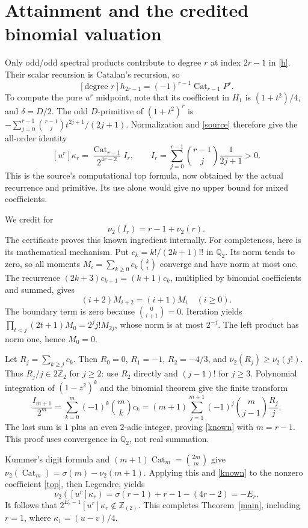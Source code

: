 \documentclass[11pt]{article}
\newcommand{\Z}{\mathbb Z}\newcommand{\Q}{\mathbb Q}
\newcommand{\loc}{\Z_{(2)}}\newcommand{\val}{\nu_2}
\newcommand{\Cat}{\operatorname{Cat}}
\newcommand{\sig}{\sigma}
\newcommand{\coef}[1]{\left[#1\right]}
\begin{document}
\newpage
\section{Attainment and the credited binomial valuation}
Only odd/odd spectral products contribute to degree $r$ at index $2r-1$ in \eqref{h}. Their scalar recursion is Catalan's recursion, so
\[
 \coef{\text{degree }r}h_{2r-1}=(-1)^{r-1}\Cat_{r-1}P^r.
\]
To compute the pure $u^r$ midpoint, note that its coefficient in $H_1$ is $(1+t^2)/4$, and $\delta=D/2$. The odd $D$-primitive of $(1+t^2)^r$ is
$-\sum_{j=0}^{r-1}\binom{r-1}{j}t^{2j+1}/(2j+1)$.
Normalization and \eqref{source} therefore give the all-order identity
\begin{equation}\label{top}
 \coef{u^r}\kappa_r=\frac{\Cat_{r-1}}{2^{4r-2}}I_r,\qquad
 I_r=\sum_{j=0}^{r-1}\binom{r-1}{j}\frac1{2j+1}>0.
\end{equation}
This is the source's computational top formula, now obtained by the actual recurrence and primitive. Its use alone would give no upper bound for mixed coefficients.

We credit \cite[Theorem~1.4]{primary} for
\begin{equation}\label{known}\val(I_r)=r-1+\val(r).\end{equation}
The certificate proves this known ingredient internally. For completeness, here is its mathematical mechanism. Put $c_k=k!/(2k+1)!!$ in $\Q_2$. Its norm tends to zero, so all moments $M_i=\sum_{k\ge0}c_k\binom{k}{i}$ converge and have norm at most one. The recurrence $(2k+3)c_{k+1}=(k+1)c_k$, multiplied by binomial coefficients and summed, gives
\[
 (i+2)M_{i+2}=(i+1)M_i\quad(i\ge0).
\]
The boundary term is zero because $\binom0{i+1}=0$. Iteration yields
$\prod_{t<j}(2t+1)M_0=2^j j!M_{2j}$, whose norm is at most $2^{-j}$. The left product has norm one, hence $M_0=0$.

Let $R_j=\sum_{k\ge j}c_k$. Then $R_0=0$, $R_1=-1$, $R_2=-4/3$, and $\val(R_j)\ge\val(j!)$. Thus $R_j/j\in2\Z_2$ for $j\ge2$: use $R_2$ directly and $(j-1)!$ for $j\ge3$. Polynomial integration of $(1-z^2)^k$ and the binomial theorem give the finite transform
\[
 \frac{I_{m+1}}{2^m}=\sum_{k=0}^m(-1)^k\binom mk c_k
 =(m+1)\sum_{j=1}^{m+1}(-1)^j\binom m{j-1}\frac{R_j}{j}.
\]
The last sum is $1$ plus an even $2$-adic integer, proving \eqref{known} with $m=r-1$. This proof uses convergence in $\Q_2$, not real summation.

Kummer's digit formula and $(m+1)\Cat_m=\binom{2m}m$ give
$\val(\Cat_m)=\sig(m)-\val(m+1)$. Applying this and \eqref{known} to the nonzero coefficient \eqref{top}, then Legendre, yields
\[
 \val(\coef{u^r}\kappa_r)=\sig(r-1)+r-1-(4r-2)=-E_r.
\]
It follows that $2^{E_r-1}\coef{u^r}\kappa_r\notin\loc$. This completes Theorem~\ref{main}, including $r=1$, where $\kappa_1=(u-v)/4$.
\end{document}

